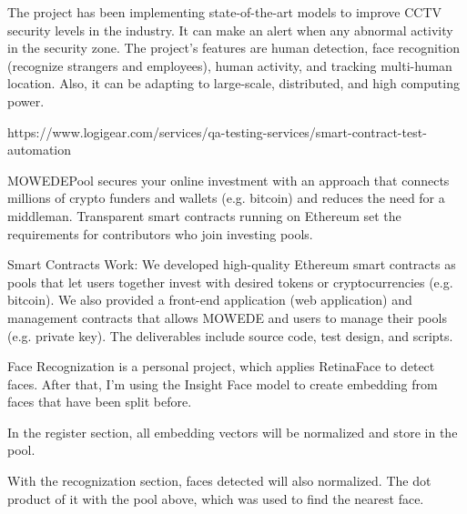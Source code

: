 \documentclass[10pt,a4paper,ragged2e,withhyper]{altacv}
\begin{document}

\begin{minipage}{\linewidth}
	\justifying
	
	The project has been implementing state-of-the-art models to improve CCTV security levels in the industry. It can make an alert when any abnormal activity in the security zone. The project's features are human detection, face recognition (recognize strangers and employees), human activity, and tracking multi-human location. Also, it can be adapting to large-scale, distributed, and high computing power. 
\end{minipage}

\medskip

\divider

\medskip

 {https://www.logigear.com/services/qa-testing-services/smart-contract-test-automation}
\begin{minipage}{\linewidth}
	\justifying
	
	MOWEDEPool secures your online investment with an approach that connects millions of crypto funders and wallets (e.g. bitcoin) and reduces the need for a middleman. Transparent smart contracts running on Ethereum set the requirements for contributors who join investing pools.
	
	Smart Contracts Work: We developed high-quality Ethereum smart contracts as pools that let users together invest with desired tokens or cryptocurrencies (e.g. bitcoin). We also provided a front-end application (web application) and management contracts that allows MOWEDE and users to manage their pools (e.g. private key). The deliverables include source code, test design, and scripts.
\end{minipage}

\medskip

\divider

\medskip


\begin{minipage}{\linewidth}
\justifying
Face Recognization is a personal project, which applies RetinaFace to detect faces. After that, I'm using the Insight Face model to create embedding from faces that have been split before.

In the register section, all embedding vectors will be normalized and store in the pool.

With the recognization section, faces detected will also normalized. The dot product of it with the pool above, which was used to find the nearest face.
\end{minipage}
\end{document}
